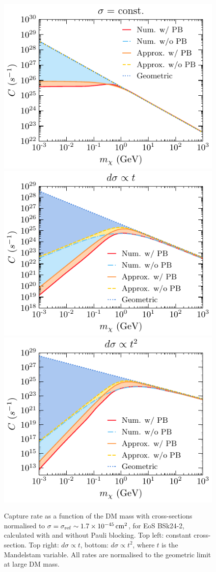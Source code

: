\begin{figure}
    \centering
    \includegraphics[width=.45\textwidth]{capture_1/capture_rate_n0.pdf}
    \includegraphics[width=.45\textwidth]{capture_1/capture_rate_n1.pdf}\\
    \includegraphics[width=.45\textwidth]{capture_1/capture_rate_n2.pdf}
    \caption{Capture rate as a function of the DM mass with cross-sections normalised to $\sigma=\sigma_\mathrm{ref}\sim 1.7 \times 10^{-45} {\rm \,cm}^2$, for EoS BSk24-2, calculated with and without Pauli blocking. Top left: constant cross-section. Top right: $d\sigma\propto t$, bottom: $d\sigma\propto t^2$, where $t$ is the Mandelstam variable. All rates are normalised to the geometric limit at large DM mass. }
    \label{ch3:fig:approxc}
\end{figure}


